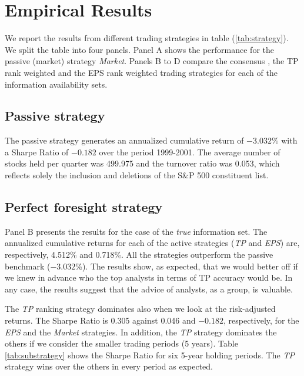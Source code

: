 \documentclass{article}\usepackage[]{graphicx}\usepackage[]{color}
\newcommand{\tr}{\textit{true}}
\begin{document}

\section{Empirical Results}
\label{sec:results}

We report the results from different trading strategies in table (\ref{tab:strategy}). We split the table into four panels. Panel A shows  the performance for  the passive (market) strategy \textit{Market}. Panels B to D compare the consensus , the TP rank weighted and the EPS rank weighted trading strategies for each of the information availability sets. 


\subsection{Passive strategy}

The passive strategy generates an annualized cumulative return of \ensuremath{-3.032}\% with a Sharpe Ratio  of \ensuremath{-0.182} over the period 1999-2001. The average number of stocks held per quarter was 499.975 and the turnover ratio was 0.053, which reflects solely the inclusion and deletions  of the S\&P 500 constituent list.

\subsection{Perfect foresight strategy}
\label{sec:perfect}
Panel B presents the results for the case of the \tr{} information set. The annualized cumulative returns for each of the active strategies (\textit{TP} and \textit{EPS}) are, respectively, 4.512\% and 0.718\%. All the strategies outperform the passive benchmark (\ensuremath{-3.032}\%). The results show, as expected, that  we would better off if we knew in advance who the top analysts in terms of TP accuracy would be. In any case, the results suggest that the advice of analysts, as a group, is valuable. 


The \textit{TP} ranking strategy dominates also when we look at the risk-adjusted returns. The Sharpe Ratio is 0.305 against 0.046 and \ensuremath{-0.182}, respectively, for the \textit{EPS} and the \textit{Market} strategies. In addition, the \textit{TP} strategy dominates  the others if we consider the smaller trading periods (5 years). Table \ref{tab:substrategy} shows the Sharpe Ratio for six 5-year holding periods. The \textit{TP} strategy wins over the others in every period as expected.
\end{document}
